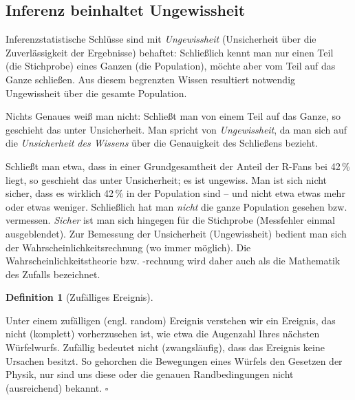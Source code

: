\documentclass[
  ngerman,
  letterpaper,
  twoside,
  open=any]{scrbook}
\theoremstyle{definition}
\theoremstyle{plain}
\theoremstyle{definition}
\theoremstyle{definition}
\newtheorem{definition}{Definition}[chapter]
\theoremstyle{definition}
\theoremstyle{definition}
\theoremstyle{remark}
\begin{document}
\subsection{Inferenz beinhaltet
Ungewissheit}\label{inferenz-beinhaltet-ungewissheit}

Inferenzstatistische Schlüsse sind mit \emph{Ungewissheit} (Unsicherheit
über die Zuverlässigkeit der Ergebnisse) behaftet: Schließlich kennt man
nur einen Teil (die Stichprobe) eines Ganzen (die Population), möchte
aber vom Teil auf das Ganze schließen. Aus diesem begrenzten Wissen
resultiert notwendig Ungewissheit über die gesamte Population.

\begin{tcolorbox}[enhanced jigsaw, arc=.35mm, bottomrule=.15mm, bottomtitle=1mm, breakable, colback=white, colbacktitle=quarto-callout-important-color!10!white, colframe=quarto-callout-important-color-frame, coltitle=black, left=2mm, leftrule=.75mm, opacityback=0, opacitybacktitle=0.6, rightrule=.15mm, title=\textcolor{quarto-callout-important-color}{\faExclamation}\hspace{0.5em}{Wichtig}, titlerule=0mm, toprule=.15mm, toptitle=1mm]

Nichts Genaues weiß man nicht: Schließt man von einem Teil auf das
Ganze, so geschieht das unter Unsicherheit. Man spricht von
\emph{Ungewissheit}, da man sich auf die \emph{Unsicherheit des Wissens}
über die Genauigkeit des Schließens bezieht.

\end{tcolorbox}

Schließt man etwa, dass in einer Grundgesamtheit der Anteil der R-Fans
bei 42\,\% liegt, so geschieht das unter Unsicherheit; es ist ungewiss.
Man ist sich nicht sicher, dass es wirklich 42\,\% in der Population
sind -- und nicht etwa etwas mehr oder etwas weniger. Schließlich hat
man \emph{nicht} die ganze Population gesehen bzw. vermessen.
\emph{Sicher} ist man sich hingegen für die Stichprobe (Messfehler
einmal ausgeblendet). Zur Bemessung der Unsicherheit (Ungewissheit)
bedient man sich der Wahrscheinlichkeitsrechnung (wo immer möglich). Die
Wahrscheinlichkeitstheorie bzw. -rechnung wird daher auch als die
Mathematik des Zufalls bezeichnet.

\begin{definition}[Zufälliges
Ereignis]\protect\hypertarget{def-zufall}{}\label{def-zufall}

Unter einem zufälligen (engl. random) Ereignis verstehen wir ein
Ereignis, das nicht (komplett) vorherzusehen ist, wie etwa die Augenzahl
Ihres nächsten Würfelwurfs. Zufällig bedeutet nicht (zwangsläufig), dass
das Ereignis keine Ursachen besitzt. So gehorchen die Bewegungen eines
Würfels den Gesetzen der Physik, nur sind uns diese oder die genauen
Randbedingungen nicht (ausreichend) bekannt. \(\square\)

\end{definition}
\end{document}

